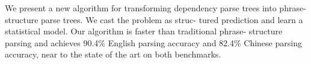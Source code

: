 We present a new algorithm for transforming dependency parse trees into phrase-structure parse trees. We cast the problem as struc- tured prediction and learn a statistical model. Our algorithm is faster than traditional phrase- structure parsing and achieves 90.4\% English parsing accuracy and 82.4\% Chinese parsing accuracy, near to the state of the art on both benchmarks.
